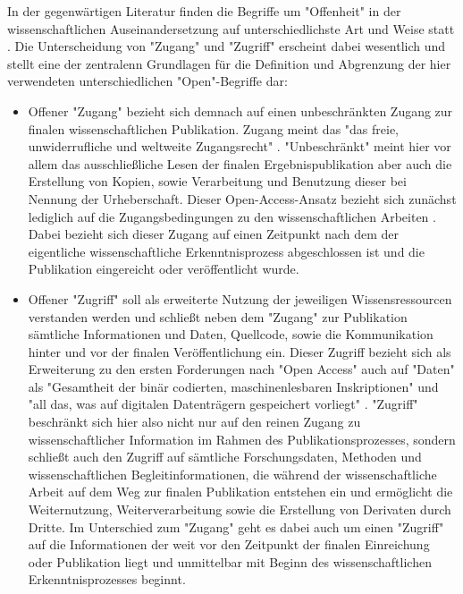 In der gegenwärtigen Literatur finden die Begriffe um "Offenheit" in der wissenschaftlichen Auseinandersetzung auf unterschiedlichste Art und Weise statt \cite{cite:9}. Die Unterscheidung von "Zugang" und "Zugriff" erscheint dabei wesentlich und stellt eine der zentralenn Grundlagen für die Definition und Abgrenzung der hier verwendeten unterschiedlichen "Open"-Begriffe dar:
\begin{itemize}
\item Offener "Zugang" bezieht sich demnach auf einen unbeschränkten Zugang zur finalen wissenschaftlichen Publikation. Zugang meint das "das freie, unwiderrufliche und
weltweite Zugangsrecht" \cite{berliner_erklaerung_2003}. "Unbeschränkt" meint hier vor allem das ausschließliche Lesen der finalen Ergebnispublikation \cite{cite:9a} aber auch die Erstellung von Kopien, sowie Verarbeitung und Benutzung dieser \cite{Lossau_oa_2007} bei Nennung der Urheberschaft. Dieser Open-Access-Ansatz bezieht sich zunächst lediglich auf die Zugangsbedingungen zu den wissenschaftlichen Arbeiten \cite{muller_2010_open}. Dabei bezieht sich dieser Zugang auf einen Zeitpunkt nach dem der eigentliche wissenschaftliche Erkenntnisprozess abgeschlossen ist und die Publikation eingereicht oder veröffentlicht wurde.
\item Offener "Zugriff" soll als erweiterte Nutzung der jeweiligen Wissensressourcen verstanden werden und schließt neben dem "Zugang" zur Publikation sämtliche Informationen und Daten, Quellcode, sowie die Kommunikation hinter und vor der finalen Veröffentlichung \cite{cite:9b} \cite{hey_2015_open} ein. Dieser Zugriff bezieht sich als Erweiterung zu den ersten Forderungen nach "Open Access" auch auf "Daten" als "Gesamtheit der binär codierten, maschinenlesbaren Inskriptionen" und "all das, was auf digitalen Datenträgern gespeichert vorliegt" \cite{Burkhardt_2015}. "Zugriff" beschränkt sich hier also nicht nur auf den reinen Zugang zu wissenschaftlicher Information im Rahmen des Publikationsprozesses, sondern schließt auch den Zugriff auf sämtliche Forschungsdaten, Methoden und wissenschaftlichen Begleitinformationen, die während der wissenschaftliche Arbeit auf dem Weg zur finalen Publikation entstehen \cite{cite:9c} ein und ermöglicht die Weiternutzung, Weiterverarbeitung sowie die Erstellung von Derivaten durch Dritte. Im Unterschied zum "Zugang" geht es dabei auch um einen "Zugriff" auf die Informationen der weit vor den Zeitpunkt der finalen Einreichung oder Publikation liegt und unmittelbar mit Beginn des wissenschaftlichen Erkenntnisprozesses beginnt.
\end{itemize}

